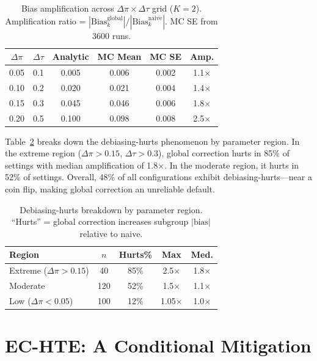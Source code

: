 \documentclass[11pt]{article}
\begin{document}
\begin{table}[t]
\centering
\small
\caption{Bias amplification across $\Delta\pi \times \Delta\tau$ grid ($K{=}2$). Amplification ratio = $|\text{Bias}^{\text{global}}_k| / |\text{Bias}^{\text{naive}}_k|$. MC SE from 3600 runs.}
\label{tab:bias-identity}
\begin{tabular}{@{}cccccc@{}}
\toprule
$\Delta\pi$ & $\Delta\tau$ & Analytic & MC Mean & MC SE & Amp. \\
\midrule
0.05 & 0.1 & 0.005 & 0.006 & 0.002 & 1.1$\times$ \\
0.10 & 0.2 & 0.020 & 0.021 & 0.004 & 1.4$\times$ \\
0.15 & 0.3 & 0.045 & 0.046 & 0.006 & 1.8$\times$ \\
0.20 & 0.5 & 0.100 & 0.098 & 0.008 & 2.5$\times$ \\
\bottomrule
\end{tabular}
\end{table}

Table~\ref{tab:hurts-regions} breaks down the debiasing-hurts phenomenon by parameter region.
In the extreme region ($\Delta\pi > 0.15$, $\Delta\tau > 0.3$), global correction hurts in 85\% of settings with median amplification of 1.8$\times$.
In the moderate region, it hurts in 52\% of settings.
Overall, 48\% of all configurations exhibit debiasing-hurts---near a coin flip, making global correction an unreliable default.

\begin{table}[t]
\centering
\small
\caption{Debiasing-hurts breakdown by parameter region. ``Hurts'' = global correction increases subgroup $|\text{bias}|$ relative to naive.}
\label{tab:hurts-regions}
\begin{tabular}{@{}lcccc@{}}
\toprule
Region & $n$ & Hurts\% & Max & Med. \\
\midrule
Extreme ($\Delta\pi{>}0.15$) & 40 & 85\% & 2.5$\times$ & 1.8$\times$ \\
Moderate & 120 & 52\% & 1.5$\times$ & 1.1$\times$ \\
Low ($\Delta\pi{<}0.05$) & 100 & 12\% & 1.05$\times$ & 1.0$\times$ \\
\bottomrule
\end{tabular}
\end{table}

\section{EC-HTE: A Conditional Mitigation}
\label{sec:method}
\end{document}
